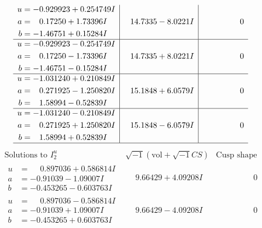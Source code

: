 \documentclass[1p]{elsarticle_modified}
\theoremstyle{definition}
\newcommand{\I}{\sqrt{-1}}
\begin{document}
$$\begin{array}{c|c|c}
\begin{aligned}
u &= -0.929923 + 0.254749 I \\
a &= \phantom{-}0.17250 + 1.73396 I \\
b &= -1.46751 + 0.15284 I\end{aligned}
 & \phantom{-}14.7335 - 8.0221 I & \phantom{-0.000000 } 0 \\ \hline\begin{aligned}
u &= -0.929923 - 0.254749 I \\
a &= \phantom{-}0.17250 - 1.73396 I \\
b &= -1.46751 - 0.15284 I\end{aligned}
 & \phantom{-}14.7335 + 8.0221 I & \phantom{-0.000000 } 0 \\ \hline\begin{aligned}
u &= -1.031240 + 0.210849 I \\
a &= \phantom{-}0.271925 - 1.250820 I \\
b &= \phantom{-}1.58994 - 0.52839 I\end{aligned}
 & \phantom{-}15.1848 + 6.0579 I & \phantom{-0.000000 } 0 \\ \hline\begin{aligned}
u &= -1.031240 - 0.210849 I \\
a &= \phantom{-}0.271925 + 1.250820 I \\
b &= \phantom{-}1.58994 + 0.52839 I\end{aligned}
 & \phantom{-}15.1848 - 6.0579 I & \phantom{-0.000000 } 0\\
 \hline 
 \end{array}$$\newpage$$\begin{array}{c|c|c}  
\text{Solutions to }I^u_{2}& \I (\text{vol} + \sqrt{-1}CS) & \text{Cusp shape}\\
 \hline 
\begin{aligned}
u &= \phantom{-}0.897036 + 0.586814 I \\
a &= -0.91039 - 1.09007 I \\
b &= -0.453265 - 0.603763 I\end{aligned}
 & \phantom{-}9.66429 + 4.09208 I & \phantom{-0.000000 } 0 \\ \hline\begin{aligned}
u &= \phantom{-}0.897036 - 0.586814 I \\
a &= -0.91039 + 1.09007 I \\
b &= -0.453265 + 0.603763 I\end{aligned}
 & \phantom{-}9.66429 - 4.09208 I & \phantom{-0.000000 } 0 \\ \hline\begin{aligned}

\end{aligned}
\end{array}$$
\end{document}
